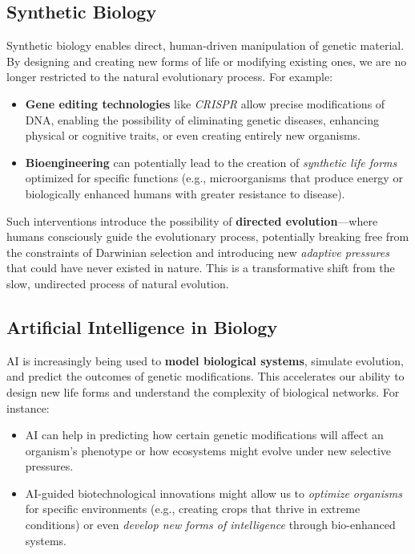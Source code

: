 \documentclass[12pt,titlepage]{book}
\begin{document}
\subsection{Synthetic Biology}

Synthetic biology enables direct, human-driven manipulation of genetic material. By designing and creating new forms of life or modifying existing ones, we are no longer restricted to the natural evolutionary process. For example:
\begin{itemize}
    \item \textbf{Gene editing technologies} like \textit{CRISPR} allow precise modifications of DNA, enabling the possibility of eliminating genetic diseases, enhancing physical or cognitive traits, or even creating entirely new organisms.
    \item \textbf{Bioengineering} can potentially lead to the creation of \textit{synthetic life forms} optimized for specific functions (e.g., microorganisms that produce energy or biologically enhanced humans with greater resistance to disease).
\end{itemize}

Such interventions introduce the possibility of \textbf{directed evolution}—where humans consciously guide the evolutionary process, potentially breaking free from the constraints of Darwinian selection and introducing new \textit{adaptive pressures} that could have never existed in nature. This is a transformative shift from the slow, undirected process of natural evolution.

\subsection{Artificial Intelligence in Biology}

AI is increasingly being used to \textbf{model biological systems}, simulate evolution, and predict the outcomes of genetic modifications. This accelerates our ability to design new life forms and understand the complexity of biological networks. For instance:
\begin{itemize}
    \item AI can help in predicting how certain genetic modifications will affect an organism’s phenotype or how ecosystems might evolve under new selective pressures.
    \item AI-guided biotechnological innovations might allow us to \textit{optimize organisms} for specific environments (e.g., creating crops that thrive in extreme conditions) or even \textit{develop new forms of intelligence} through bio-enhanced systems.
\end{itemize}
\end{document}
